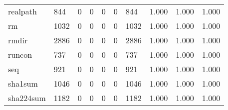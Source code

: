 \begin{longtable}{lp{1.3cm}p{1.3cm}p{1.3cm}p{1.3cm}p{1.3cm}p{1.3cm}p{1.3cm}p{1.3cm}p{1.3cm}}
realpath  &                    844 &                                  0 &                                 0 &                                0 &                                 0 &                             844 &                                1.000 &                                  1.000 &                                1.000 \\
rm        &                   1032 &                                  0 &                                 0 &                                0 &                                 0 &                            1032 &                                1.000 &                                  1.000 &                                1.000 \\
rmdir     &                   2886 &                                  0 &                                 0 &                                0 &                                 0 &                            2886 &                                1.000 &                                  1.000 &                                1.000 \\
runcon    &                    737 &                                  0 &                                 0 &                                0 &                                 0 &                             737 &                                1.000 &                                  1.000 &                                1.000 \\
seq       &                    921 &                                  0 &                                 0 &                                0 &                                 0 &                             921 &                                1.000 &                                  1.000 &                                1.000 \\
sha1sum   &                   1046 &                                  0 &                                 0 &                                0 &                                 0 &                            1046 &                                1.000 &                                  1.000 &                                1.000 \\
sha224sum &                   1182 &                                  0 &                                 0 &                                0 &                                 0 &                            1182 &                                1.000 &                                  1.000 &                                1.000 \\

\end{longtable}
